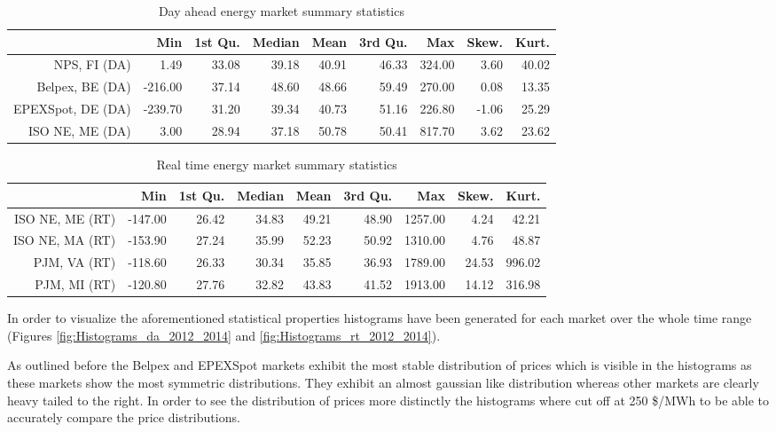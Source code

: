 \begin{table}[ht]
\centering
\begin{tabular}{rrrrrrrrr}
  \hline
 & Min & 1st Qu. & Median & Mean & 3rd Qu. & Max & Skew. & Kurt. \\ 
  \hline
NPS, FI (DA) & 1.49 & 33.08 & 39.18 & 40.91 & 46.33 & 324.00 & 3.60 & 40.02 \\ 
  Belpex, BE (DA) & -216.00 & 37.14 & 48.60 & 48.66 & 59.49 & 270.00 & 0.08 & 13.35 \\ 
  EPEXSpot, DE (DA) & -239.70 & 31.20 & 39.34 & 40.73 & 51.16 & 226.80 & -1.06 & 25.29 \\ 
  ISO NE, ME (DA) & 3.00 & 28.94 & 37.18 & 50.78 & 50.41 & 817.70 & 3.62 & 23.62 \\ 
   \hline
\end{tabular}
\caption{Day ahead energy market summary statistics}
\label{table:day_ahead_market_summary}
\end{table}
\begin{table}[ht]
\centering
\begin{tabular}{rrrrrrrrr}
  \hline
 & Min & 1st Qu. & Median & Mean & 3rd Qu. & Max & Skew. & Kurt. \\ 
  \hline
ISO NE, ME (RT) & -147.00 & 26.42 & 34.83 & 49.21 & 48.90 & 1257.00 & 4.24 & 42.21 \\ 
  ISO NE, MA (RT) & -153.90 & 27.24 & 35.99 & 52.23 & 50.92 & 1310.00 & 4.76 & 48.87 \\ 
  PJM, VA (RT) & -118.60 & 26.33 & 30.34 & 35.85 & 36.93 & 1789.00 & 24.53 & 996.02 \\ 
  PJM, MI (RT) & -120.80 & 27.76 & 32.82 & 43.83 & 41.52 & 1913.00 & 14.12 & 316.98 \\ 
   \hline
\end{tabular}
\caption{Real time energy market summary statistics}
\label{table:real_time_market_summary}
\end{table}


In order to visualize the aforementioned statistical properties histograms have been generated for each market over the whole time range (Figures \ref{fig:Histograms_da_2012_2014} and \ref{fig:Histograms_rt_2012_2014}). 

As outlined before the Belpex and EPEXSpot markets exhibit the most stable distribution of prices which is visible in the histograms as these markets show the most symmetric distributions. They exhibit an almost gaussian like distribution whereas other markets are clearly heavy tailed to the right. In order to see the distribution of prices more distinctly the histograms where cut off at 250 \$/MWh to be able to accurately compare the price distributions. 

